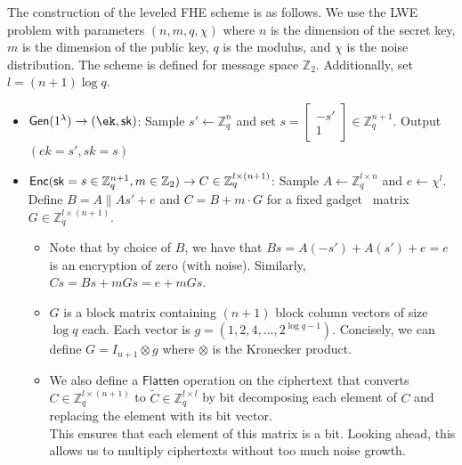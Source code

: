 The construction of the leveled FHE scheme is as follows. We use the LWE problem with parameters $(n, m, q, \chi)$ where $n$ is the dimension of the secret key, $m$ is the dimension of the public key, $q$ is the modulus, and $\chi$ is the noise distribution. The scheme is defined for message space $\mathbb{Z}_2$. Additionally, set $l = (n+1) \log q$.
\begin{itemize}
    \item $\mathsf{Gen}(1^\lambda) \rightarrow (\ek, \sk)$: Sample $s' \gets \mathbb{Z}_q^{n}$ and set $s =  
    \begin{bmatrix}
        -s' \\
        1
    \end{bmatrix} \in \mathbb{Z}_q^{n+1}$. 
    Output $(ek = s', sk = s)$

    \item $\mathsf{Enc}(\mathsf{sk} = s \in \mathbb{Z}_q^{n+1}, m \in \mathbb{Z}_2) \rightarrow C \in \mathbb{Z}_q^{l \times (n+1)}$: Sample $A \gets \mathbb{Z}_q^{l \times n}$ and $e \gets \chi^{l}$. Define $B = A \| As' + e$ and $C = B + m \cdot G$ for a fixed gadget~\cite{EC:MicPei12} matrix $G \in \mathbb{Z}_q^{l \times (n+1)}$.
    
    \begin{itemize}
        \item Note that by choice of $B$, we have that $Bs = A(-s') + A(s') + e = e$ is an encryption of zero (with noise). Similarly, $Cs = Bs + mGs = e + mGs$. 
        \item $G$ is a block matrix containing $(n+1)$ block column vectors of size $\log q$ each. Each vector is $g = (1, 2, 4, \ldots, 2^{\log q - 1})$. Concisely, we can define $G = I_{n+1} \otimes g$ where $\otimes$ is the Kronecker product.
        \item We also define a $\mathsf{Flatten}$ operation on the ciphertext that converts $C \in \mathbb{Z}_q^{l \times (n+1)}$ to $\tilde{C} \in \mathbb{Z}_q^{l \times l}$ by bit decomposing each element of $C$ and replacing the element with its bit vector. \\
        This ensures that each element of this matrix is a bit. Looking ahead, this allows us to multiply ciphertexts without too much noise growth.
    \end{itemize}
    
\end{itemize}
